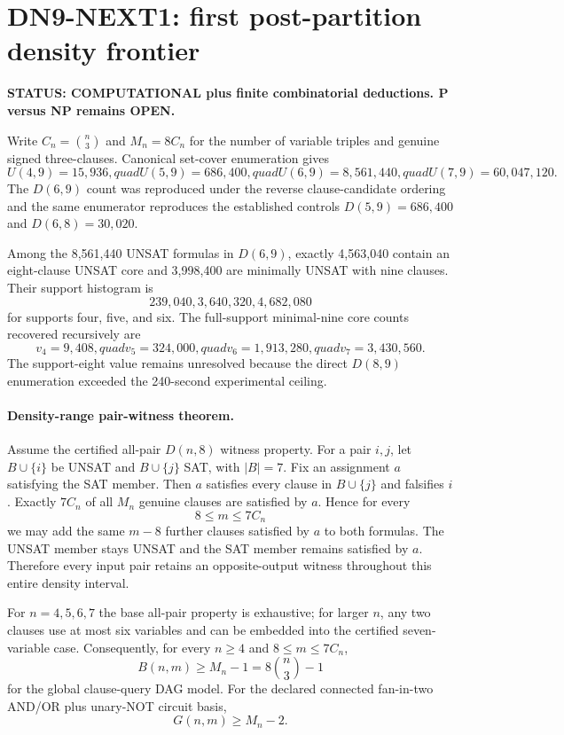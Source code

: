 \section*{DN9-NEXT1: first post-partition density frontier}

\textbf{STATUS: COMPUTATIONAL plus finite combinatorial deductions. P versus NP remains OPEN.}

Write \(C_n=\binom n3\) and \(M_n=8C_n\) for the number of variable triples and genuine signed three-clauses. Canonical set-cover enumeration gives
\[
U(4,9)=15{,}936,quad
U(5,9)=686{,}400,quad
U(6,9)=8{,}561{,}440,quad
U(7,9)=60{,}047{,}120.
\]
The \(D(6,9)\) count was reproduced under the reverse clause-candidate ordering and the same enumerator reproduces the established controls \(D(5,9)=686{,}400\) and \(D(6,8)=30{,}020\).

Among the 8,561,440 UNSAT formulas in \(D(6,9)\), exactly 4,563,040 contain an eight-clause UNSAT core and 3,998,400 are minimally UNSAT with nine clauses. Their support histogram is
\[
239{,}040, 3{,}640{,}320, 4{,}682{,}080
\]
for supports four, five, and six. The full-support minimal-nine core counts recovered recursively are
\[
v_4=9{,}408,quad
v_5=324{,}000,quad
v_6=1{,}913{,}280,quad
v_7=3{,}430{,}560.
\]
The support-eight value remains unresolved because the direct \(D(8,9)\) enumeration exceeded the 240-second experimental ceiling.

\paragraph{Density-range pair-witness theorem.}
Assume the certified all-pair \(D(n,8)\) witness property. For a pair \(i,j\), let \(B\cup\{i\}\) be UNSAT and \(B\cup\{j\}\) SAT, with \(|B|=7\). Fix an assignment \(a\) satisfying the SAT member. Then \(a\) satisfies every clause in \(B\cup\{j\}\) and falsifies \(i\). Exactly \(7C_n\) of all \(M_n\) genuine clauses are satisfied by \(a\). Hence for every
\[
8\le m\le 7C_n
\]
we may add the same \(m-8\) further clauses satisfied by \(a\) to both formulas. The UNSAT member stays UNSAT and the SAT member remains satisfied by \(a\). Therefore every input pair retains an opposite-output witness throughout this entire density interval.

For \(n=4,5,6,7\) the base all-pair property is exhaustive; for larger \(n\), any two clauses use at most six variables and can be embedded into the certified seven-variable case. Consequently, for every \(n\ge4\) and \(8\le m\le7C_n\),
\[
B(n,m)\ge M_n-1=8\binom n3-1
\]
for the global clause-query DAG model. For the declared connected fan-in-two AND/OR plus unary-NOT circuit basis,
\[
G(n,m)\ge M_n-2.
\]

